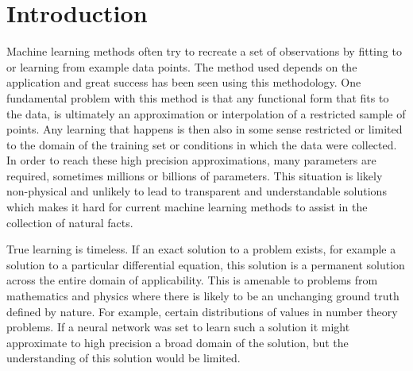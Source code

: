 \documentclass[journal=jcisd8,manuscript=article,layout=onecolumn,pdftex,floatfix,amsmath,amssymb,10pt]{achemso}
\begin{document}
\begin{abstract}
\end{abstract}



\section{Introduction}
Machine learning methods often try to recreate a set of observations by fitting to or learning from example data points. The method used depends on the application and great success has been seen using this methodology. One fundamental problem with this method is that any functional form that fits to the data, is ultimately an approximation or interpolation of a restricted sample of points. Any learning that happens is then also in some sense restricted or limited to the domain of the training set or conditions in which the data were collected. In order to reach these high precision approximations, many parameters are required, sometimes millions or billions of parameters. This situation is likely non-physical and unlikely to lead to transparent and understandable solutions which makes it hard for current machine learning methods to assist in the collection of natural facts.

True learning is timeless. If an exact solution to a problem exists, for example a solution to a particular differential equation, this solution is a permanent solution across the entire domain of applicability. This is amenable to problems from mathematics and physics where there is likely to be an unchanging ground truth defined by nature. For example, certain distributions of values in number theory problems. If a neural network was set to learn such a solution it might approximate to high precision a broad domain of the solution, but the understanding of this solution would be limited. 
\end{document}
